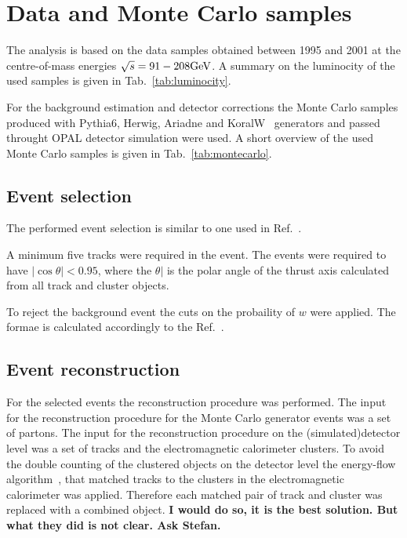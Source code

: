 \section{Data and Monte Carlo samples}
\label{sec:selection}
The analysis is based on the data samples obtained between 1995 and 2001 
at the centre-of-mass energies $\sqrt{s}=91-208{\text{Ge}\kern-0.06667em\text{V\/}}$. A summary on the luminocity
of the used samples is given in Tab.~\ref{tab:luminocity}.
\TABluminocity


For the background estimation and detector corrections the Monte Carlo samples 
produced with Pythia6, Herwig, Ariadne and KoralW~\cite{Skrzypek:1995wd} generators 
and passed throught OPAL detector simulation were used.
A short overview of the used Monte Carlo samples is given in Tab.~\ref{tab:montecarlo}.
\TABmontecarlo


\subsection{Event selection}
\label{sec:selection}
The performed event selection is similar to one used in Ref.~\cite{}.

A minimum five tracks were required in the event.
The events were required to have $|\cos\theta|<0.95$, where the  
$\theta|$ is the polar angle of the thrust axis calculated from all track
and cluster objects.

To reject the background event the cuts on the probaility of $w$ were applied.
The formae is calculated accordingly to the Ref.~.






\subsection{Event reconstruction}
\label{sec:reconstruction}
For the selected events the reconstruction procedure was performed.
The input for the reconstruction procedure for the Monte Carlo generator events
was a set of partons.
The input for the reconstruction procedure on the (simulated)detector level
 was a set of tracks and the electromagnetic calorimeter clusters.
To avoid the double counting of the clustered objects on the detector level the energy-flow 
algorithm~\cite{Ackerstaff:1997nga,Abbiendi:1999sy}, that matched tracks to the 
 clusters in the electromagnetic calorimeter was applied. Therefore each 
 matched pair of track and cluster was replaced with a combined object.
 {\bf I would do so, it is the best solution. But what they did is not clear. Ask Stefan.}

